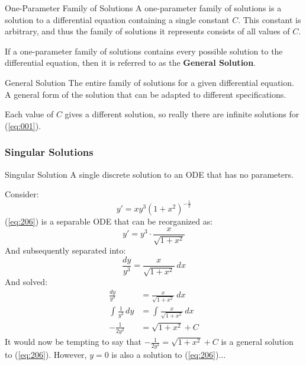 \documentclass[12pt]{article}
\begin{document}
\begin{definition}{One-Parameter Family of Solutions}
  A one-parameter family of solutions is a solution to a differential equation containing a single constant $C$. This constant is arbitrary, and thus the family of solutions it represents consists of all values of $C$.
\end{definition}

If a one-parameter family of solutions contains every possible solution to the differential equation, then it is referred to as the \textbf{General Solution}.

\begin{definition}{General Solution}
  The entire family of solutions for a given differential equation. A general form of the solution that can be adapted to different specifications.
\end{definition}

Each value of $C$ gives a different solution, so really there are infinite solutions for (\ref{eq:001}).

\subsubsection{Singular Solutions}
\label{sssec:singularSolutions}

\begin{definition}{Singular Solution}
  A single discrete solution to an ODE that has no parameters.
\end{definition}

Consider:
\begin{equation}
  y' = xy^3\left(1+x^2\right)^{-\frac{1}{2}}
  \label{eq:206}
\end{equation}
(\ref{eq:206}) is a separable ODE that can be reorganized as:
\begin{equation*}
  y' = y^3 \cdot \frac{x}{\sqrt{1+x^2}}
\end{equation*}
And subsequently separated into:
\begin{equation*}
  \frac{dy}{y^3} = \frac{x}{\sqrt{1+x^2}}\ dx
\end{equation*}
And solved:
\begin{align*}
  \frac{dy}{y^3} &= \frac{x}{\sqrt{1+x^2}}\ dx \\
  \int_{}^{} \frac{1}{y^3} \, dy &= \int_{}^{} \frac{x}{\sqrt{1+x^2}}\,dx \\
  -\frac{1}{2y^2} &= \sqrt{1+x^2} + C
\end{align*}
It would now be tempting to say that $-\frac{1}{2y^2} = \sqrt{1+x^2} + C$ is a general solution to (\ref{eq:206}). However, $y=0$ is also a solution to (\ref{eq:206})$\hdots$
\end{document}
